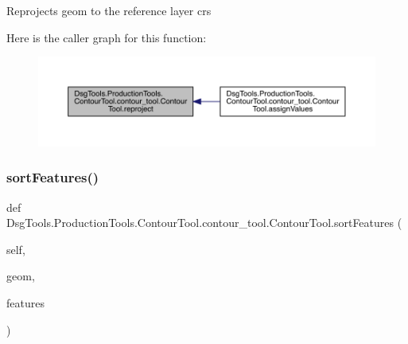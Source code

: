 \begin{DoxyVerb}Reprojects geom to the reference layer crs
\end{DoxyVerb}
 Here is the caller graph for this function\+:
\nopagebreak
\begin{figure}[H]
\begin{center}
\leavevmode
\includegraphics[width=350pt]{class_dsg_tools_1_1_production_tools_1_1_contour_tool_1_1contour__tool_1_1_contour_tool_ad4eeaf446ce7ef596213c8731de8ea68_icgraph}
\end{center}
\end{figure}
\mbox{\label{class_dsg_tools_1_1_production_tools_1_1_contour_tool_1_1contour__tool_1_1_contour_tool_a01bdbd09cc15fe60b49d1f351e810c23}} 
\subsubsection{\texorpdfstring{sort\+Features()}{sortFeatures()}}
{\footnotesize\ttfamily def Dsg\+Tools.\+Production\+Tools.\+Contour\+Tool.\+contour\+\_\+tool.\+Contour\+Tool.\+sort\+Features (\begin{DoxyParamCaption}\item[{}]{self,  }\item[{}]{geom,  }\item[{}]{features }\end{DoxyParamCaption})}

